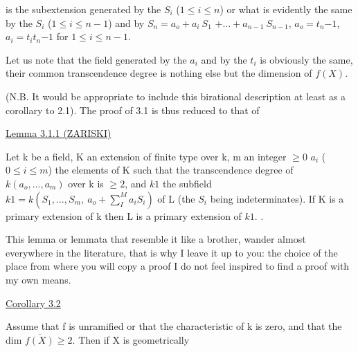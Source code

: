 
is the subextension generated by the $S_i$ ($1 \leq i \leq n$) or what is
evidently the same by the $S_i$ ($1 \leq i \leq n - 1$) and by $S_n = a_o + a_i\ S_1$
$+\ldots+a_{n-1}\ S_{n-1}$, $a_o = t_n{-1}$, $a_i = t_it_n{-1}$ for $1 \leq i \leq n - 1$.

Let us note that the field generated by the $a_i$ and by the $t_i$
is obviously the same, their common transcendence degree is
nothing else but the dimension of $f(X)$.

(N.B. It would be appropriate to include this birational
description at least as a corollary to 2.1).  The proof of 3.1 is
thus reduced to that of

\uline{Lemma 3.1.1 (ZARISKI)}

Let k be a field, K an extension of finite type over k, m an
integer $\geq 0$ $a_i$ ($0 \leq i \leq m$) the elements of K such that the
transcendence degree of $k(a_o,\ldots,a_m)$ over k is $\geq 2$, and $k1$ the
subfield $k1 = k(S_1,\ldots,S_m,\ a_o + \sum\limits_{I}^{M} a_iS_i)$ of L (the $S_i$ being
indeterminates).  If K is a primary extension of k then L is a
primary extension of $k1$.   .

This lemma or lemmata that resemble it like a brother, wander
almost everywhere in the literature, that is why I leave it up to
you:  the choice of the place from where you will copy a proof I
do not feel inspired to find a proof with my own means.

\uline{Corollary 3.2}

Assume that f is unramified or that the characteristic of k
is zero, and that the dim $\overline{f(X)} \geq 2$. Then if X is geometrically
